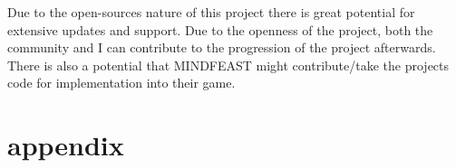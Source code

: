 Due to the open-sources nature of this project there is great potential for extensive updates and support. Due to the openness of the project, both the community and I can contribute to the progression of the project afterwards. There is also a potential that MINDFEAST might contribute/take the projects code for implementation into their game.

\printbibliography

\section{appendix}

